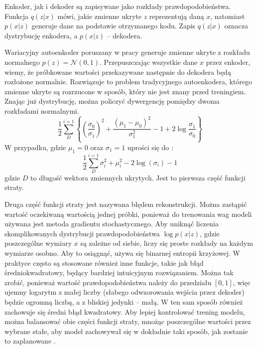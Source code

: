 \documentclass[a4paper,12pt,oneside]{book} %
\begin{document}
Enkoder, jak i dekoder są zapisywane jako rozkłady prawdopodobieństwa. Funkcja $q(z|x)$ mówi, jakie zmienne ukryte $z$ reprezentują daną $x$, natomiast $p(x|z)$ generuje dane na podstawie otrzymanego kodu. Zapis $q(z|x)$ oznacza dystrybucję enkodera, a $p(x|z)$ -- dekodera.

Wariacyjny autoenkoder poruszany w pracy generuje zmienne ukryte z rozkładu normalnego $p(z)=\mathcal{N}(0,1)$. Przepuszczając wszystkie dane $x$ przez enkoder, wiemy, że próbkowane wartości przekazywane następnie do dekodera będą rozłożone normalnie. Rozwiązuje to problem tradycyjnego autoenkodera, którego zmienne ukryte są rozrzucone w sposób, który nie jest znany przed treningiem. Znając już dystrybucję, można policzyć dywergencję pomiędzy dwoma rozkładami normalnymi.
\begin{equation}
	\dfrac{1}{2}\displaystyle\sum_{D}^{i=1}\left\{\left(\dfrac{\sigma_0}{\sigma_1}\right)^2+\dfrac{(\mu_1 - \mu_0)^2}{\sigma_1^2} - 1 + 2\log\dfrac{\sigma_1}{\sigma_0}\right\}
	\label{equ:kldnormals}
\end{equation}
W przypadku, gdzie $\mu_1 = 0$ oraz $\sigma_1=1$ uprości się do \cite{kingma2014autoencoding}:
\begin{equation}
	\dfrac{1}{2}\displaystyle\sum_{D}^{i=1}\sigma_i^2+\mu_i^2-2\log(\sigma_i)-1
	\label{equ:kld_loss}
\end{equation} 
gdzie $D$ to długość wektora zmiennych ukrytych. Jest to pierwsza część funkcji straty. 

Druga część funkcji straty jest nazywana błędem rekonstrukcji. Można zastąpić wartość oczekiwaną wartością jednej próbki, ponieważ do trenowania wag modeli używana jest metoda gradientu stochastycznego. Aby uniknąć liczenia skomplikowanych dystrybucji prawdopodobieństwa $\log p(x|z)$, gdzie poszczególne wymiary $x$ są zależne od siebie, liczy się proste rozkłady na każdym wymiarze osobno. Aby to osiągnąć, używa się binarnej entropii krzyżowej. W praktyce często są stosowane również inne funkcje, takie jak błąd średniokwadratowy, będący bardziej intuicyjnym rozwiązaniem.
Można tak zrobić, ponieważ wartość prawdopodobieństwa należy do przedziału $\left[ 0, 1\right] $, więc ujemny logarytm z małej liczby (słabego odwzorowania wejścia przez dekoder) będzie ogromną liczbą, a z bliskiej jedynki -- małą. W ten sam sposób również zachowuje się średni błąd kwadratowy. Aby lepiej kontrolować trening modelu, można balansować obie części funkcji straty, mnożąc poszczególne wartości przez wybrane stałe, aby model zachowywał się w dokładnie taki sposób, jak zostanie to zaplanowane \cite{balancing}.
\end{document}
